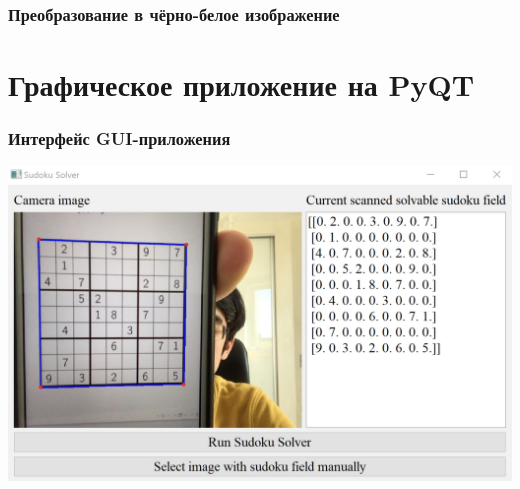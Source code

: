 \documentclass{beamer}
\begin{document}
\begin{frame}
\frametitle{Преобразование в чёрно-белое изображение}
\begin{center}
\end{center}

\end{frame}


\section{Графическое приложение на PyQT}

\begin{frame}
\frametitle{Интерфейс GUI-приложения}
\includegraphics[width=\textwidth]{sudoku_app_in_action}
\end{frame}
\end{document}
